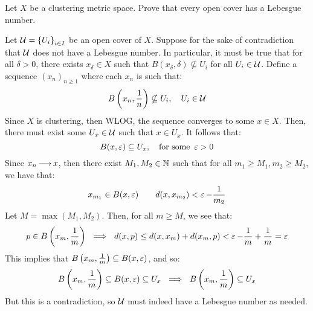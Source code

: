 \newpage
\label{q17}
\begin{qu}[title=Lebesgue Number Lemma,num=17]
    Let $ X $ be a clustering metric space. Prove that every open cover has a
    Lebesgue number.
\end{qu}

\begin{soln}
    Let $ \mathcal{U} = \left\{{U_{i}}\right\}_{i \in I} $ be an open cover of $ X $.
    Suppose for the sake of contradiction that $ \mathcal{U} $ does not have a
    Lebesgue number.
    In particular, it must be true that for all $ \delta > 0 $, there exists
    $ x_{\delta} \in X $ such that $ B(x_{\delta}, \delta) \nsubseteq U_{i} $
    for all $ U_{i} \in \mathcal{U} $. \vsp
    Define a sequence $ (x_{n})_{n \geq 1} $ where each $ x_{n} $ is such that:
    \begin{equation*}
        B\left( x_{n}, \frac{1}{n} \right) \nsubseteq U_{i}, \quad U_{i} \in
        \mathcal{U}
    \end{equation*}
    Since $ X $ is clustering, then WLOG, the sequence converges to some
    $ x \in X $.
    Then, there must exist some $ U_{x} \in \mathcal{U} $ such that $ x \in U_{x} $.
    It follows that:
    \begin{equation*}
        B(x, \operatorname{\varepsilon}) \subseteq U_{x}, \quad \textrm{for some } \operatorname{\varepsilon} > 0
    \end{equation*}
    Since $ x_{n} \operatorname{\longrightarrow} x $, then there exist $ M_{1}, M_{2} \in \mathbb{N} $
    such that for all $ m_{1} \geq M_{1}, m_{2} \geq M_{2} $, we have that:
    \begin{equation*}
        x_{m_{1}} \in B(x, \operatorname{\varepsilon}) \qquad d(x, x_{m_{2}}) < \operatorname{\varepsilon} - \frac{1}{m_{2}}
    \end{equation*}
    Let $ M = \max(M_{1}, M_{2}) $. Then, for all $ m \geq M $, we see that:
    \begin{equation*}
        p \in B \left( x_{m}, \frac{1}{m} \right)
        \ \implies \ d(x, p) \leq d(x, x_{m}) + d(x_{m}, p) < \operatorname{\varepsilon} - \frac{1}{m}
        + \frac{1}{m} = \operatorname{\varepsilon}
    \end{equation*}
    This implies that $ B \left( x_{m}, \frac{1}{m} \right)
    \subseteq B(x, \operatorname{\varepsilon}) $, and so:
    \begin{equation*}
        B \left( x_{m}, \frac{1}{m} \right) \subseteq B(x, \operatorname{\varepsilon}) \subseteq U_{x}
        \ \implies \ B \left( x_{m}, \frac{1}{m} \right) \subseteq U_{x}
    \end{equation*}
    But this is a contradiction, so $ \mathcal{U} $ must indeed have a Lebesgue number
    as needed.
\end{soln}


